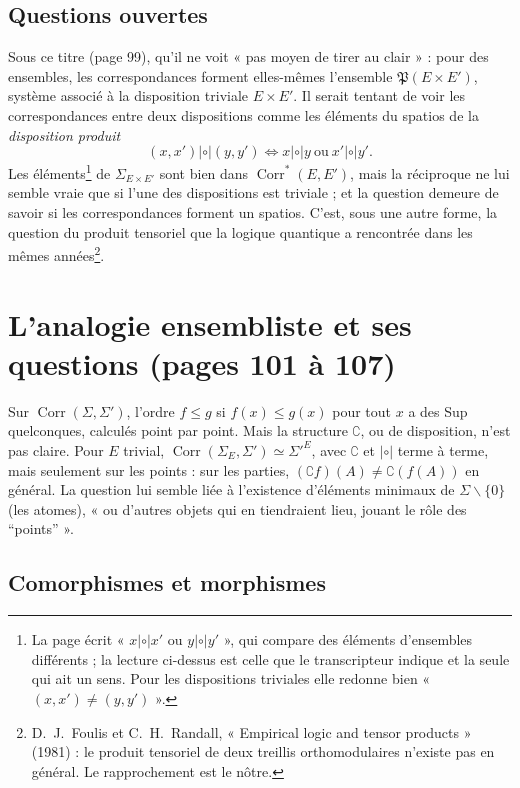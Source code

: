 \documentclass[11pt,a4paper]{article}
\begin{document}
\subsection*{Questions ouvertes}

Sous ce titre (page 99), qu'il ne voit « pas moyen de tirer au clair » : pour des ensembles,
les correspondances forment elles-mêmes l'ensemble $\mathfrak{P}(E \times E')$,
système associé à la disposition triviale $E \times E'$. Il serait tentant de voir
les correspondances entre deux dispositions comme les éléments du spatios de la
\emph{disposition produit}
\[
(x, x') \mathrel{|\circ|} (y, y') \iff x \mathrel{|\circ|} y \ \text{ou}\ x'
\mathrel{|\circ|} y' .
\]
Les éléments\footnote{La page écrit « $x \mathrel{|\circ|} x'$ ou $y
\mathrel{|\circ|} y'$ », qui compare des éléments d'ensembles différents ; la
lecture ci-dessus est celle que le transcripteur indique et la seule qui ait un
sens. Pour les dispositions triviales elle redonne bien « $(x,x') \neq (y,y')$ ».} de $\Sigma_{E \times E'}$ sont bien dans
$\operatorname{Corr}^{*}(E, E')$, mais la réciproque ne lui semble vraie que si
l'une des dispositions est triviale ; et la question demeure de savoir si les
correspondances forment un spatios. C'est, sous une autre forme, la question du
produit tensoriel que la logique quantique a rencontrée dans les mêmes
années\footnote{D.~J.~Foulis et C.~H.~Randall, « Empirical logic and tensor
products » (1981) : le produit tensoriel de deux treillis orthomodulaires
n'existe pas en général. Le rapprochement est le nôtre.}.

\section*{L'analogie ensembliste et ses questions (pages 101 à 107)}

Sur $\operatorname{Corr}(\Sigma, \Sigma')$, l'ordre $f \leq g$ si $f(x) \leq g(x)$
pour tout $x$ a des Sup quelconques, calculés point par point. Mais la structure
$\complement$, ou de disposition, n'est pas claire. Pour $E$ trivial,
$\operatorname{Corr}(\Sigma_{E}, \Sigma') \simeq \Sigma'^{E}$, avec $\complement$ et
$\mathrel{|\circ|}$ terme à terme, mais seulement sur les points : sur les
parties, $(\complement f)(A) \neq \complement(f(A))$ en général. La question lui
semble liée à l'existence d'éléments minimaux de $\Sigma \smallsetminus \{0\}$
(les atomes), « ou d'autres objets qui en tiendraient lieu, jouant le rôle des
“points” ».

\subsection*{Comorphismes et morphismes}
\end{document}
